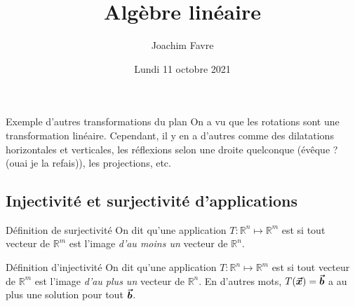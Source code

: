 \documentclass[a4paper]{article}
\title{Algèbre linéaire}
\author{Joachim Favre}
\date{Lundi 11 octobre 2021}
\begin{document}
\maketitle


\begin{parag}{Exemple d'autres transformations du plan}
    On a vu que les rotations sont une transformation linéaire. Cependant, il y en a d'autres comme des dilatations horizontales et verticales, les réflexions selon une droite quelconque (évêque ? (ouai je la refais)), les projections, etc.
\end{parag}


\subsection{Injectivité et surjectivité d'applications}

\begin{parag}{Définition de surjectivité}
    On dit qu'une application $T: \mathbb{R}^{n} \mapsto \mathbb{R}^{m}$ est  si tout vecteur de $\mathbb{R}^{m}$ est l'image \emph{d'au moins un} vecteur de $\mathbb{R}^{n}$.
\end{parag}

\begin{parag}{Définition d'injectivité}
    On dit qu'une application $T: \mathbb{R}^{n} \mapsto \mathbb{R}^{m}$ est  si tout vecteur de $\mathbb{R}^{m}$ est l'image \emph{d'au plus un} vecteur de $\mathbb{R}^{n}$. En d'autres mots, $T\left(\bvec{x}\right) = \bvec{b}$ a au plus une solution pour tout $\bm{\protect\vec{b}}$.
\end{parag}
\end{document}
